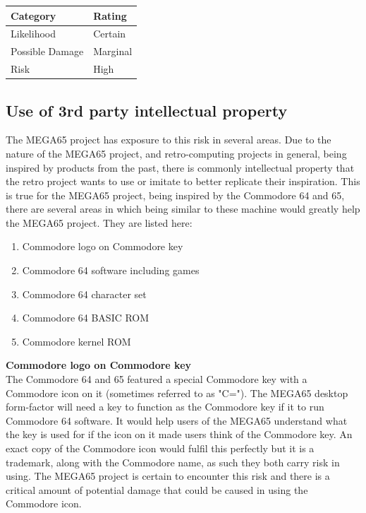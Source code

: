 \begin{tabular}{l|l} %
    	\textbf{Category} 	&	\textbf{Rating} \\
      \hline
     Likelihood			&	Certain \\
     Possible Damage 	& 	Marginal \\
     Risk 				&	High		\\	
    \end{tabular}


\subsection{Use of 3rd party intellectual property}
The MEGA65 project has exposure to this risk in several areas. Due to the nature of the MEGA65 project, and retro-computing projects in general, being inspired by products from the past, there is commonly intellectual property that the retro project wants to use or imitate to better replicate their inspiration. This is true for the MEGA65 project, being inspired by the Commodore 64 and 65, there are several areas in which being similar to these machine would greatly help the MEGA65 project. They are listed here:

\begin{enumerate}
\item Commodore logo on Commodore key
\item Commodore 64 software including games
\item Commodore 64 character set
\item Commodore 64 BASIC ROM
\item Commodore kernel ROM
\end{enumerate}

\textbf{Commodore logo on Commodore key} \\
The Commodore 64 and 65 featured a special Commodore key with a Commodore icon on it (sometimes referred to as "C="). The MEGA65 desktop form-factor will need a key to function as the Commodore key if it to run Commodore 64 software. It would help users of the MEGA65 understand what the key is used for if the icon on it made users think of the Commodore key. An exact copy of the Commodore icon would fulfil this perfectly but it is a trademark, along with the Commodore name, as such they both carry risk in using. The MEGA65 project is certain to encounter this risk and there is a critical amount of potential damage that could be caused in using the Commodore icon. \\

